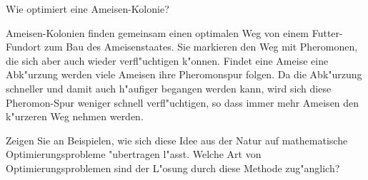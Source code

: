 \begin{aufgabe}
Wie optimiert eine Ameisen-Kolonie?
\end{aufgabe}

{\parindent 0pt Ameisen-Kolonien} finden gemeinsam einen optimalen Weg von einem
Futter-Fundort zum Bau des Ameisenstaates. Sie markieren den Weg
mit Pheromonen, die sich aber auch wieder verfl"uchtigen k"onnen.
Findet eine Ameise eine Abk"urzung werden viele Ameisen ihre Pheromonspur 
folgen.
Da die Abk"urzung schneller und damit auch h"aufiger begangen werden 
kann, wird sich diese Pheromon-Spur weniger schnell verfl"uchtigen,
so dass immer mehr Ameisen den k"urzeren Weg nehmen werden.

Zeigen Sie an Beispielen, wie sich diese Idee aus der Natur auf
mathematische Optimierungsprobleme "ubertragen l"asst. Welche
Art von Optimierungsproblemen sind der L"osung durch diese Methode
zug"anglich?
